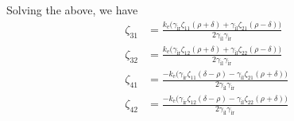 Solving the above, we have
\begin{align*}
  \zeta_{31} &= \frac{k_\text{e}\bigl(\gamma_\text{ir}\zeta_{11}(\rho + \delta) + \gamma_\text{il}\zeta_{21}(\rho - \delta)\bigr)}{2\gamma_\text{il}\gamma_\text{ir}}\\
  \zeta_{32} &= \frac{k_\text{e}\bigl(\gamma_\text{ir}\zeta_{12}(\rho + \delta) + \gamma_\text{il}\zeta_{22}(\rho - \delta)\bigr)}{2\gamma_\text{il}\gamma_\text{ir}}\\
  \zeta_{41} &= \frac{-k_\text{e}\bigl(\gamma_\text{ir}\zeta_{11}(\delta - \rho) - \gamma_\text{il}\zeta_{21}(\rho + \delta)\bigr)}{2\gamma_\text{il}\gamma_\text{ir}}\\
  \zeta_{42} &= \frac{-k_\text{e}\bigl(\gamma_\text{ir}\zeta_{12}(\delta - \rho) - \gamma_\text{il}\zeta_{22}(\rho + \delta)\bigr)}{2\gamma_\text{il}\gamma_\text{ir}}\\
\end{align*}

